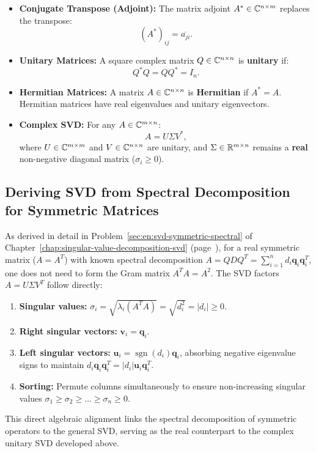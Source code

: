 \begin{itemize}
    \item \textbf{Conjugate Transpose (Adjoint):} The matrix adjoint $A^* \in \mathbb{C}^{n \times m}$ replaces the transpose:
    \begin{equation}
        (A^*)_{ij} = \overline{a_{ji}}.
    \end{equation}
    \item \textbf{Unitary Matrices:} A square complex matrix $Q \in \mathbb{C}^{n \times n}$ is \textbf{unitary} if:
    \begin{equation}
        Q^* Q = Q Q^* = I_n.
    \end{equation}
    \item \textbf{Hermitian Matrices:} A matrix $A \in \mathbb{C}^{n \times n}$ is \textbf{Hermitian} if $A^* = A$. Hermitian matrices have real eigenvalues and unitary eigenvectors.
    \item \textbf{Complex SVD:} For any $A \in \mathbb{C}^{m \times n}$:
    \begin{equation}
        A = U \Sigma V^*,
    \end{equation}
    where $U \in \mathbb{C}^{m \times m}$ and $V \in \mathbb{C}^{n \times n}$ are unitary, and $\Sigma \in \mathbb{R}^{m \times n}$ remains a \textbf{real} non-negative diagonal matrix ($\sigma_i \ge 0$).
\end{itemize}

\subsection{Deriving SVD from Spectral Decomposition for Symmetric Matrices}
\label{sec:svd-symmetric-recap-en}

As derived in detail in Problem~\ref{sec:en:svd-symmetric-spectral} of Chapter~\ref{chap:singular-value-decomposition-svd} (page~\pageref{sec:en:svd-symmetric-spectral}), for a real symmetric matrix ($A = A^T$) with known spectral decomposition $A = Q D Q^T = \sum_{i=1}^n d_i \mathbf{q}_i \mathbf{q}_i^T$, one does not need to form the Gram matrix $A^T A = A^2$. The SVD factors $A = U \Sigma V^T$ follow directly:
\begin{enumerate}
    \item \textbf{Singular values:} $\sigma_i = \sqrt{\lambda_i(A^T A)} = \sqrt{d_i^2} = |d_i| \ge 0$.
    \item \textbf{Right singular vectors:} $\mathbf{v}_i = \mathbf{q}_i$.
    \item \textbf{Left singular vectors:} $\mathbf{u}_i = \operatorname{sgn}(d_i) \mathbf{q}_i$, absorbing negative eigenvalue signs to maintain $d_i \mathbf{q}_i \mathbf{q}_i^T = |d_i| \mathbf{u}_i \mathbf{q}_i^T$.
    \item \textbf{Sorting:} Permute columns simultaneously to ensure non-increasing singular values $\sigma_1 \ge \sigma_2 \ge \dots \ge \sigma_n \ge 0$.
\end{enumerate}
This direct algebraic alignment links the spectral decomposition of symmetric operators to the general SVD, serving as the real counterpart to the complex unitary SVD developed above.


